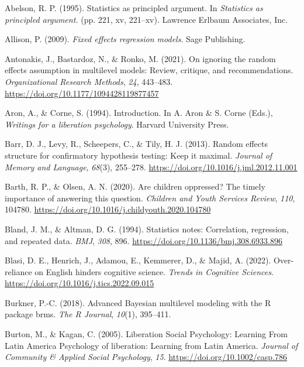 \documentclass[
  letterpaper,
  DIV=11,
  numbers=noendperiod]{scrreprt}
\newlength{\cslhangindent}
\newenvironment{CSLReferences}[2] %
 {\begin{list}{}{%
  \setlength{\itemindent}{0pt}
  \setlength{\leftmargin}{0pt}
  \setlength{\parsep}{0pt}
  \ifodd #1
   \setlength{\leftmargin}{\cslhangindent}
   \setlength{\itemindent}{-1\cslhangindent}
  \fi
  \setlength{\itemsep}{#2\baselineskip}}}
 {\end{list}}
\begin{document}
\label{refs}
\begin{CSLReferences}{1}{0}
Abelson, R. P. (1995). Statistics as principled argument. In
\emph{Statistics as principled argument.} (pp. 221, xv, 221--xv).
Lawrence Erlbaum Associates, Inc.

Allison, P. (2009). \emph{Fixed effects regression models}. Sage
Publishing.

Antonakis, J., Bastardoz, N., \& Ronko, M. (2021). On ignoring the
random effects assumption in multilevel models: Review, critique, and
recommendations. \emph{Organizational Research Methods}, \emph{24},
443--483. \url{https://doi.org/10.1177/1094428119877457}

Aron, A., \& Corne, S. (1994). Introduction. In A. Aron \& S. Corne
(Eds.), \emph{Writings for a liberation psychology}. Harvard University
Press.

Barr, D. J., Levy, R., Scheepers, C., \& Tily, H. J. (2013). Random
effects structure for confirmatory hypothesis testing: Keep it maximal.
\emph{Journal of Memory and Language}, \emph{68}(3), 255--278.
\url{https://doi.org/10.1016/j.jml.2012.11.001}

Barth, R. P., \& Olsen, A. N. (2020). Are children oppressed? The timely
importance of answering this question. \emph{Children and Youth Services
Review}, \emph{110}, 104780.
\url{https://doi.org/10.1016/j.childyouth.2020.104780}

Bland, J. M., \& Altman, D. G. (1994). Statistics notes: Correlation,
regression, and repeated data. \emph{BMJ}, \emph{308}, 896.
\url{https://doi.org/10.1136/bmj.308.6933.896}

Blasi, D. E., Henrich, J., Adamou, E., Kemmerer, D., \& Majid, A.
(2022). Over-reliance on {E}nglish hinders cognitive science.
\emph{Trends in Cognitive Sciences}.
\url{https://doi.org/10.1016/j.tics.2022.09.015}

Burkner, P.-C. (2018). Advanced {B}ayesian multilevel modeling with the
{R} package brms. \emph{The R Journal}, \emph{10}(1), 395--411.

Burton, M., \& Kagan, C. (2005). {Liberation Social Psychology: Learning
From Latin America Psychology of liberation: Learning from Latin
America}. \emph{Journal of Community \& Applied Social Psychology},
\emph{15}. \url{https://doi.org/10.1002/casp.786}


\end{CSLReferences}
\end{document}
